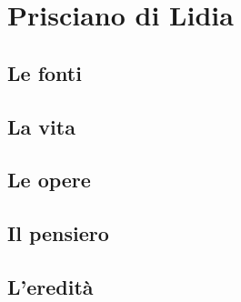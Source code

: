 \chapter{Prisciano di Lidia}

\section{Le fonti}

\section{La vita}

\section{Le opere}

\section{Il pensiero}

\section{L'eredità}
